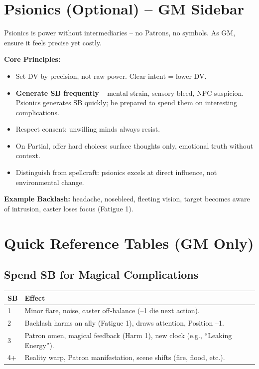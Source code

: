 \section{Psionics (Optional) – GM Sidebar}
\label{sec:psionics-gm}

\begin{tcolorbox}[
  title={Adjudicating Psionics},
  colback=gray!6,
  colframe=black,
  fonttitle=\bfseries
]
Psionics is power without intermediaries – no Patrons, no symbols. As GM, ensure it feels precise yet costly.

\medskip
\noindent\textbf{Core Principles:}
\begin{itemize}
  \item Set DV by precision, not raw power. Clear intent = lower DV.
  \item \textbf{Generate SB frequently} – mental strain, sensory bleed, NPC suspicion. Psionics generates SB quickly; be prepared to spend them on interesting complications.
  \item Respect consent: unwilling minds always resist.
  \item On Partial, offer hard choices: surface thoughts only, emotional truth without context.
  \item Distinguish from spellcraft: psionics excels at direct influence, not environmental change.
\end{itemize}

\noindent\textbf{Example Backlash:} headache, nosebleed, fleeting vision, target becomes aware of intrusion, caster loses focus (Fatigue 1).
\end{tcolorbox}

\section{Quick Reference Tables (GM Only)}
\label{sec:magic-quickref}

\subsection*{Spend SB for Magical Complications}
\begin{center}
\begin{tabular}{ll}
\toprule
\textbf{SB} & \textbf{Effect} \\
\midrule
1 & Minor flare, noise, caster off‑balance (–1 die next action). \\
2 & Backlash harms an ally (Fatigue 1), draws attention, Position –1. \\
3 & Patron omen, magical feedback (Harm 1), new clock (e.g., ``Leaking Energy''). \\
4+ & Reality warp, Patron manifestation, scene shifts (fire, flood, etc.). \\
\bottomrule
\end{tabular}
\end{center}

